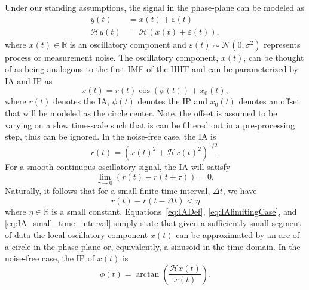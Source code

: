 \documentclass[journal,11pt,a4paper,onecolumn,draftcls]{IEEEtran}
\begin{document}
Under our standing assumptions, the signal in the phase-plane can be modeled as
\begin{align}\label{eq:SignalModel}
y\left( t \right) &= x\left( t \right) + \varepsilon \left( t \right) \\
\mathcal{H}y\left( t \right) &= \mathcal{H}(x\left( t \right) + \varepsilon \left( t \right)),
\end{align}
where $x(t) \in \mathbb{R}$ is an oscillatory component and $\varepsilon(t) \sim \mathcal{N}(0,\sigma^2)$ represents process or measurement noise. The oscillatory component, $x(t)$, can be thought of as being analogous to the first IMF of the HHT and can be parameterized by IA and IP as
\begin{equation}\label{eq:InstAmplitudeAndPhase}
    x\left( t \right) = r\left( t \right)\cos \left( {\phi \left( t \right)} \right) + x_0(t),
\end{equation}
where $r(t)$ denotes the IA, $\phi(t)$ denotes the IP and $x_0(t)$ denotes an offset that will be modeled as the circle center. Note, the offset is assumed to be varying on a slow time-scale such that is can be filtered out in a pre-processing step, thus can be ignored. In the noise-free case, the IA is
\begin{equation}\label{eq:IADef}
    r\left( t \right) = \left( x(t)^2 + \mathcal{H}x(t)^2\right)^{1/2}.
\end{equation}
For a smooth continuous oscillatory signal, the IA will satisfy
\begin{equation}\label{eq:IAlimitingCase}
\mathop {\lim }\limits_{\tau  \to 0} \left( r\left( t \right) - r\left( t + \tau \right) \right) = 0,
\end{equation}
Naturally, it follows that for a small finite time interval, $\Delta t$, we have
\begin{equation}\label{eq:IA_small_time_interval}
    r(t)-r(t-\Delta t) < \eta
\end{equation}
where $\eta \in \mathbb{R}$ is a small constant. Equations~\ref{eq:IADef}, \ref{eq:IAlimitingCase}, and \ref{eq:IA_small_time_interval} simply state that given a sufficiently small segment of data the local oscillatory component $x(t)$ can be approximated by an arc of a circle in the phase-plane or, equivalently, a sinusoid in the time domain. In the noise-free case, the IP of $x(t)$ is
\begin{equation}\label{IPdef}
    \phi \left( t \right) = \arctan \left( \frac{\mathcal{H}x\left( t \right)}
    {x\left( t \right)} \right).
\end{equation}
\end{document}
